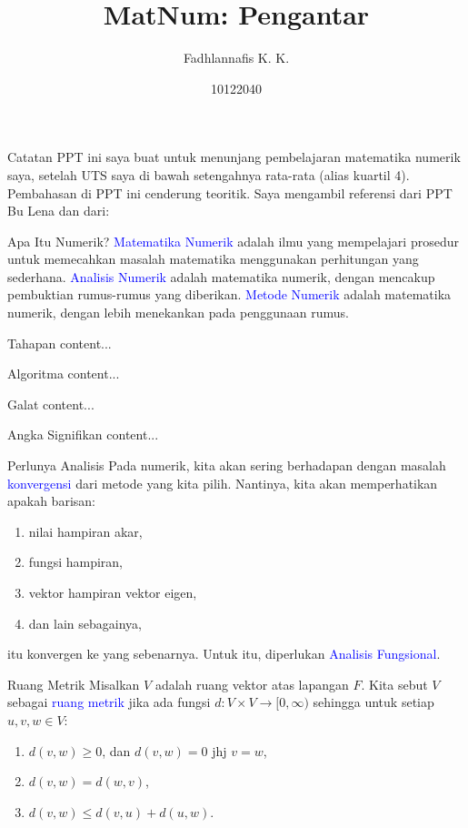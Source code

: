 \documentclass[xcolor={dvipsnames}]{beamer}
\title{MatNum: Pengantar}
\author{Fadhlannafis K. K.}
\date{10122040}
\newcommand{\emp}[1]{\textcolor{Blue}{#1}}
\begin{document}
	\begin{frame}[plain]
		\maketitle
	\end{frame}
	\begin{frame}{Catatan}
		PPT ini saya buat untuk menunjang pembelajaran matematika numerik saya, setelah UTS saya di bawah setengahnya rata-rata (alias kuartil 4). \newline
		Pembahasan di PPT ini cenderung teoritik. Saya mengambil referensi dari PPT Bu Lena dan dari:
		\nocite{*}
		\printbibliography
	\end{frame}
	\begin{frame}{Apa Itu Numerik?}
		\emp{Matematika Numerik} adalah ilmu yang mempelajari prosedur untuk memecahkan masalah matematika menggunakan perhitungan yang sederhana. \newline
		\emp{Analisis Numerik} adalah matematika numerik, dengan mencakup pembuktian rumus-rumus yang diberikan. \newline
		\emp{Metode Numerik} adalah matematika numerik, dengan lebih menekankan pada penggunaan rumus.
	\end{frame}
	\begin{frame}{Tahapan}
		content...
	\end{frame}
	\begin{frame}{Algoritma}
		content...
	\end{frame}
	\begin{frame}{Galat}
		content...
	\end{frame}
	\begin{frame}{Angka Signifikan}
		content...
	\end{frame}
	\begin{frame}{Perlunya Analisis}
		Pada numerik, kita akan sering berhadapan dengan masalah \emp{konvergensi} dari metode yang kita pilih. \newline
		Nantinya, kita akan memperhatikan apakah barisan:
		\begin{enumerate}
			\item nilai hampiran akar,
			\item fungsi hampiran,
			\item vektor hampiran vektor eigen,
			\item dan lain sebagainya,
		\end{enumerate}
		itu konvergen ke yang sebenarnya. Untuk itu, diperlukan \emp{Analisis Fungsional}.
	\end{frame}
	\begin{frame}{Ruang Metrik}
		Misalkan $V$ adalah ruang vektor atas lapangan $F$. Kita sebut $V$ sebagai \emp{ruang metrik} jika ada fungsi $d:V\times V\to [0,\infty)$ sehingga untuk setiap $u,v,w\in V$:
		\begin{enumerate}
			\item $d(v,w) \geq 0$, dan $d(v,w) = 0$ jhj $v=w$,
			\item $d(v,w) = d(w,v)$,
			\item $d(v,w) \leq d(v,u) + d(u,w)$.
		\end{enumerate}
	\end{frame}
\end{document}
